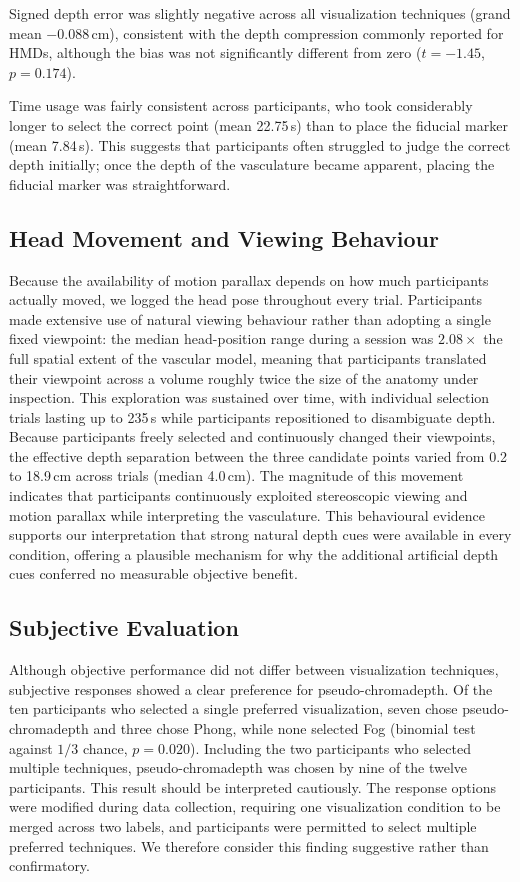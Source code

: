 \documentclass[runningheads]{llncs}
\begin{document}
Signed depth error was slightly negative across all visualization techniques (grand mean $-0.088$\,cm), consistent with the depth compression commonly reported for HMDs, although the bias was not significantly different from zero ($t=-1.45$, $p=0.174$).

Time usage was fairly consistent across participants, who took considerably longer to select the correct point (mean 22.75\,s) than to place the fiducial marker (mean 7.84\,s). This suggests that participants often struggled to judge the correct depth initially; once the depth of the vasculature became apparent, placing the fiducial marker was straightforward.

\subsection{Head Movement and Viewing Behaviour}

Because the availability of motion parallax depends on how much participants actually moved, we logged the head pose throughout every trial. Participants made extensive use of natural viewing behaviour rather than adopting a single fixed viewpoint: the median head-position range during a session was $2.08\times$ the full spatial extent of the vascular model, meaning that participants translated their viewpoint across a volume roughly twice the size of the anatomy under inspection. This exploration was sustained over time, with individual selection trials lasting up to 235\,s while participants repositioned to disambiguate depth. Because participants freely selected and continuously changed their viewpoints, the effective depth separation between the three candidate points varied from 0.2 to 18.9\,cm across trials (median 4.0\,cm).
The magnitude of this movement indicates that participants continuously exploited stereoscopic viewing and motion parallax while interpreting the vasculature. This behavioural evidence supports our interpretation that strong natural depth cues were available in every condition, offering a plausible mechanism for why the additional artificial depth cues conferred no measurable objective benefit.

\subsection{Subjective Evaluation}
Although objective performance did not differ between visualization techniques, subjective responses showed a clear preference for pseudo-chromadepth. Of the ten participants who selected a single preferred visualization, seven chose pseudo-chromadepth and three chose Phong, while none selected Fog (binomial test against $1/3$ chance, $p=0.020$). Including the two participants who selected multiple techniques, pseudo-chromadepth was chosen by nine of the twelve participants. This result should be interpreted cautiously. The response options were modified during data collection, requiring one visualization condition to be merged across two labels, and participants were permitted to select multiple preferred techniques. We therefore consider this finding suggestive rather than confirmatory.
\end{document}
